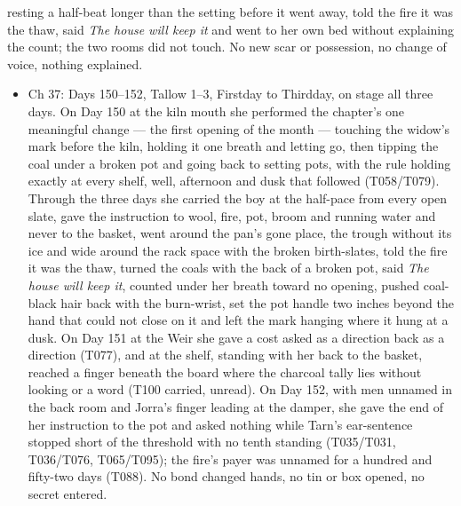 \documentclass{design/chronicle}
\begin{document}
{\begin{itemize}[leftmargin=1.4em,itemsep=1pt,topsep=3pt,parsep=0pt]
resting a half-beat longer than the setting before it went away, told the fire it was the thaw, said \emph{The house will keep it} and went to her own bed without explaining the count; the two rooms did not touch. No new scar or possession, no change of voice, nothing explained.

\end{itemize}

\begin{itemize}[leftmargin=1.4em,itemsep=1pt,topsep=3pt,parsep=0pt]

\item Ch 37: Days 150–152, Tallow 1–3, Firstday to Thirdday, on stage all three days. On Day 150 at the kiln mouth she performed the chapter’s one meaningful change --- the first opening of the month --- touching the widow’s mark before the kiln, holding it one breath and letting go, then tipping the coal under a broken pot and going back to setting pots, with the rule holding exactly at every shelf, well, afternoon and dusk that followed (T058/T079). Through the three days she carried the boy at the half-pace from every open slate, gave the instruction to wool, fire, pot, broom and running water and never to the basket, went around the pan’s gone place, the trough without its ice and wide around the rack space with the broken birth-slates, told the fire it was the thaw, turned the coals with the back of a broken pot, said \emph{The house will keep it}, counted under her breath toward no opening, pushed coal-black hair back with the burn-wrist, set the pot handle two inches beyond the hand that could not close on it and left the mark hanging where it hung at a dusk. On Day 151 at the Weir she gave a cost asked as a direction back as a direction (T077), and at the shelf, standing with her back to the basket, reached a finger beneath the board where the charcoal tally lies without looking or a word (T100 carried, unread). On Day 152, with men unnamed in the back room and Jorra’s finger leading at the damper, she gave the end of her instruction to the pot and asked nothing while Tarn’s ear-sentence stopped short of the threshold with no tenth standing (T035/T031, T036/T076, T065/T095); the fire’s payer was unnamed for a hundred and fifty-two days (T088). No bond changed hands, no tin or box opened, no secret entered.

\end{itemize}

\begin{itemize}[leftmargin=1.4em,itemsep=1pt,topsep=3pt,parsep=0pt]


\end{itemize}}
\end{document}
